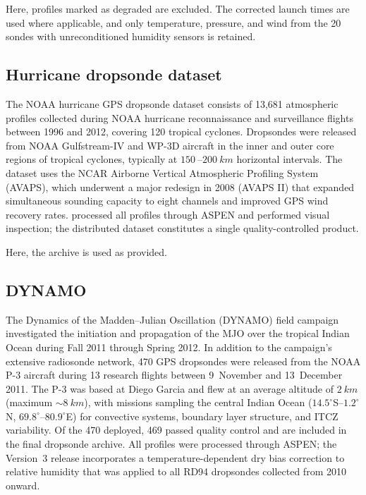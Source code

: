 \documentclass[11pt]{article}
\begin{document}
Here, profiles marked as degraded are excluded.  The corrected launch times are used where applicable, and only temperature, pressure, and wind from the 20 sondes with unreconditioned humidity sensors is retained.

\subsection{Hurricane dropsonde dataset}

The NOAA hurricane GPS dropsonde dataset \citep{wang2015} consists of 13,681 atmospheric profiles collected during NOAA hurricane reconnaissance and surveillance flights between 1996 and 2012, covering 120 tropical cyclones.  Dropsondes were released from NOAA Gulfstream-IV and WP-3D aircraft in the inner and outer core regions of tropical cyclones, typically at $\SI{150}{}$--$\SI{200}{km}$ horizontal intervals.  The dataset uses the NCAR Airborne Vertical Atmospheric Profiling System (AVAPS), which underwent a major redesign in 2008 (AVAPS II) that expanded simultaneous sounding capacity to eight channels and improved GPS wind recovery rates.  \citet{wang2015} processed all profiles through ASPEN and performed visual inspection; the distributed dataset constitutes a single quality-controlled product.

Here, the archive is used as provided.

\subsection{DYNAMO}

The Dynamics of the Madden--Julian Oscillation (DYNAMO) field campaign \citep{ciesielski2014} investigated the initiation and propagation of the MJO over the tropical Indian Ocean during Fall 2011 through Spring 2012.  In addition to the campaign's extensive radiosonde network, 470 GPS dropsondes were released from the NOAA P-3 aircraft during 13 research flights between 9~November and 13~December 2011.  The P-3 was based at Diego Garcia and flew at an average altitude of $\SI{2}{km}$ (maximum ${\sim}\SI{8}{km}$), with missions sampling the central Indian Ocean ($14.5^\circ$S--$1.2^\circ$N, $69.8^\circ$--$80.9^\circ$E) for convective systems, boundary layer structure, and ITCZ variability.  Of the 470 deployed, 469 passed quality control and are included in the final dropsonde archive.  All profiles were processed through ASPEN; the Version~3 release incorporates a temperature-dependent dry bias correction to relative humidity that was applied to all RD94 dropsondes collected from 2010 onward.
\end{document}
